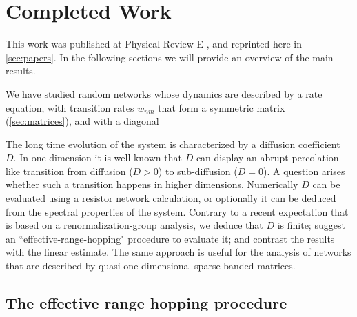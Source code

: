 \chapter{Completed Work}


This work was published at Physical Review E \cite{de_leeuw_diffusion_2012},
and reprinted here in \autoref{sec:papers}. In the
following sections we will provide an overview
of the main results.









We have studied random networks whose dynamics are
described by a rate equation, with transition rates $w_{nm}$
that form a symmetric matrix (\autoref{sec:matrices}),
and with a diagonal  

The long time evolution
of the system is characterized by a diffusion coefficient~$D$.
In one dimension it is well known that $D$ can display an abrupt
percolation-like transition from diffusion (${D>0}$)
to sub-diffusion (${D=0}$). A question arises whether
such a transition happens in higher dimensions.
Numerically $D$ can be evaluated using a resistor network
calculation, or optionally it can be deduced from 
the spectral properties of the system. Contrary to a recent 
expectation that is based on a renormalization-group analysis, 
we deduce that $D$ is finite; 
suggest an ``effective-range-hopping" procedure to evaluate it;
and contrast the results with the linear estimate.
The same approach is useful for the analysis of 
networks that are described by quasi-one-dimensional  
sparse banded matrices. 


\section{The effective range hopping procedure}


